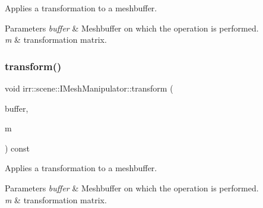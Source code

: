 Applies a transformation to a meshbuffer. 


\begin{DoxyParams}{Parameters}
{\em buffer} & Meshbuffer on which the operation is performed. \\
\hline
{\em m} & transformation matrix. \\
\hline
\end{DoxyParams}
\mbox{\label{classirr_1_1scene_1_1IMeshManipulator_a14dc2101f7facaddec49f59ed363bbc1}} 
\subsubsection{\texorpdfstring{transform()}{transform()}\hspace{0.1cm}{\footnotesize\ttfamily [4/4]}}
{\footnotesize\ttfamily void irr\+::scene\+::\+I\+Mesh\+Manipulator\+::transform (\begin{DoxyParamCaption}\item[{\hyperlink{classirr_1_1scene_1_1IMeshBuffer}{I\+Mesh\+Buffer} $\ast$}]{buffer,  }\item[{const \hyperlink{namespaceirr_1_1core_a4c9d4e29899535971052810954a14431}{core\+::matrix4} \&}]{m }\end{DoxyParamCaption}) const\hspace{0.3cm}{\ttfamily [inline]}}



Applies a transformation to a meshbuffer. 


\begin{DoxyParams}{Parameters}
{\em buffer} & Meshbuffer on which the operation is performed. \\
\hline
{\em m} & transformation matrix. \\
\hline
\end{DoxyParams}
\mbox{\label{classirr_1_1scene_1_1IMeshManipulator_a10e09e28622a5d1f5fd0f3a65fd2cb5b}} 

